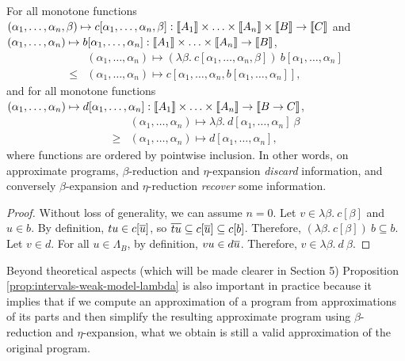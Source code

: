 \begin{proposition} \label{prop:intervals-weak-model-lambda} For all monotone functions $(\alpha_1, \ldots, \alpha_n, \beta) \mapsto c[\alpha_1, \ldots, \alpha_n, \beta] : \llbracket A_1 \rrbracket \times \ldots \times \llbracket A_n \rrbracket \times  \llbracket B \rrbracket \to \llbracket C \rrbracket$ and $(\alpha_1, \ldots, \alpha_n) \mapsto b[\alpha_1, \ldots, \alpha_n] : \llbracket A_1 \rrbracket \times \ldots \times \llbracket A_n \rrbracket \to \llbracket B \rrbracket$, $$\begin{array}{ll} & (\alpha_1, \ldots, \alpha_n) \mapsto (\lambda \beta.~  c[\alpha_1, \ldots, \alpha_n, \beta])~ b[\alpha_1, \ldots, \alpha_n] \\ \leq & (\alpha_1, \ldots, \alpha_n) \mapsto c[\alpha_1, \ldots, \alpha_n, b[\alpha_1, \ldots, \alpha_n]]\text{,}\end{array}$$
and for all monotone functions $(\alpha_1, \ldots, \alpha_n) \mapsto d[\alpha_1, \ldots, \alpha_n] : \llbracket A_1 \rrbracket \times \ldots \times \llbracket A_n \rrbracket \to  \llbracket B \to C \rrbracket$,
$$\begin{array}{ll} & (\alpha_1, \ldots, \alpha_n) \mapsto \lambda \beta.~  d[\alpha_1, \ldots, \alpha_n]~ \beta \\ \geq & (\alpha_1, \ldots, \alpha_n) \mapsto d[\alpha_1, \ldots, \alpha_n]\text{,}\end{array}$$
where functions are ordered by pointwise inclusion.  In other words, on approximate programs, $\beta$-reduction and $\eta$-expansion \emph{discard} information, and conversely $\beta$-expansion and $\eta$-reduction \emph{recover} some information.
\end{proposition}

\begin{proof} Without loss of generality, we can assume $n=0$.
Let $v \in \lambda \beta.~ c[\beta]$ and $u \in b$. By definition, $tu \in c[\overline{u}]$, so $\overline{tu} \subseteq c[\overline{u}] \subseteq c[b]$. Therefore, $(\lambda \beta.~ c[\beta])~ b \subseteq b$.
Let $v \in d$. For all $u \in \Lambda_B$, by definition, $vu \in d\overline{u}$. Therefore, $v \in \lambda \beta.~ d~ \beta$.
\end{proof}

Beyond theoretical aspects (which will be made clearer in Section 5)
Proposition \ref{prop:intervals-weak-model-lambda} is also important in practice because it implies that if we compute an approximation of a program from approximations of its parts and then simplify the resulting approximate program using $\beta$-reduction and $\eta$-expansion, what we obtain is still a valid approximation of the original program.


